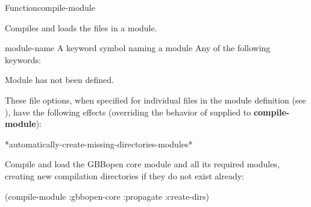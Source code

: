 \documentclass[10pt,twoside,english,pdftex]{article}
\begin{document}
\begin{functiondoc}{Function}{compile-module}{ 
    } 
%
% 
%
%
%

\fnsyntax 

\fnpurpose Compiles and loads the files in a module.

\fnpackage {}

\fnmodule {}

\fnargs
\begin{args}{module-name}
 A keyword symbol naming a module 
\arg[option] Any of the following keywords: 
\compilemoduleoptions
\end{args}

\fnerrors Module  has not been defined.

\fndescription These file options, when specified for individual files in the
module definition (see \textbf{}), have the
following effects (overriding the behavior of  supplied to
\textbf{compile-module}): \compilemodulefileoptions

\begin{alsos}{*automatically-create-missing-directories-modules*}
\end{alsos}

\fnexample Compile and load the GBBopen core module and all its
required modules, creating new compilation directories if they do not
exist already:
\begin{example}
  (compile-module :gbbopen-core :propagate :create-dirs)
\end{example}

\end{functiondoc}

\end{document}
